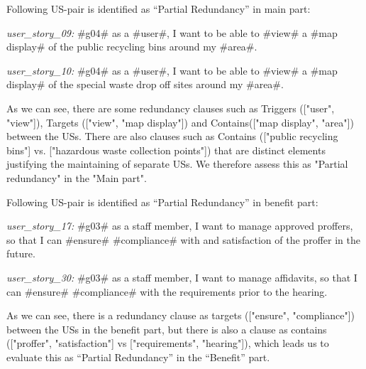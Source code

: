 \begin{example}
	Following US-pair is identified as \enquote{Partial Redundancy} in main part:
	
	\textit{user\_story\_09:} \#g04\# as a \#user\#, I want to be able to \#view\# a \#map display\# of the public recycling bins around my \#area\#.
	
	\textit{user\_story\_10:} \#g04\# as a \#user\#, I want to be able to \#view\# a \#map display\# of the special waste drop off sites around my \#area\#.
	
	As we can see, there are some redundancy clauses such as Triggers (["user", "view"]), Targets (["view", "map display"]) and Contains(["map display", "area"]) between the USs. There are also clauses such as Contains (["public recycling bins"] vs. ["hazardous waste collection points"]) that are distinct elements justifying the maintaining of separate USs. We therefore assess this as "Partial redundancy" in the "Main part".
\end{example}
\begin{example}
	Following US-pair is identified as \enquote{Partial Redundancy} in benefit part:
	
	\textit{user\_story\_17:} \#g03\# as a staff member, I want to manage approved proffers, so that I can \#ensure\# \#compliance\# with and satisfaction of the proffer in the future.
	
	\textit{user\_story\_30:} \#g03\# as a staff member, I want to manage affidavits, so that I can \#ensure\# \#compliance\# with the requirements prior to the hearing.
	
	As we can see, there is a redundancy clause as targets (["ensure", "compliance"]) between the USs in the benefit part, but there is also a clause as contains (["proffer", "satisfaction"] vs ["requirements", "hearing"]), which leads us to evaluate this as \enquote{Partial Redundancy} in the \enquote{Benefit} part.
\end{example}
